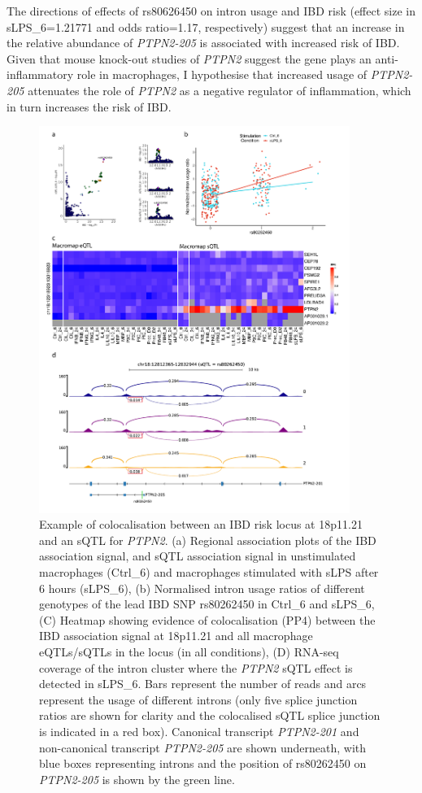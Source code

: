 The directions of effects of rs80626450 on intron usage and IBD risk (effect size in sLPS\_6=1.21771  and odds ratio=1.17, respectively) suggest that an increase in the relative abundance of \textit{PTPN2-205} is associated with increased risk of IBD. Given that mouse knock-out studies of \textit{PTPN2} suggest the gene plays an anti-inflammatory role in macrophages, I hypothesise that increased usage of \textit{PTPN2-205} attenuates the role of \textit{PTPN2} as a negative regulator of inflammation, which in turn increases the risk of IBD. \\

\begin{figure}[H]
  \centering
  \includegraphics[width=0.9\textwidth]{ptpn2}
  \caption{Example of colocalisation between an IBD risk locus at 18p11.21 and an sQTL for \textit{PTPN2}.  (a) Regional association plots of the IBD association signal, and sQTL association signal in unstimulated macrophages (Ctrl\_6) and macrophages stimulated with sLPS after 6 hours (sLPS\_6), (b) Normalised intron usage ratios of different genotypes of the lead IBD SNP rs80262450 in Ctrl\_6 and sLPS\_6, (C) Heatmap showing evidence of colocalisation (PP4) between the IBD association signal at 18p11.21 and all macrophage eQTLs/sQTLs in the locus (in all conditions), (D) RNA-seq coverage of the intron cluster where the \textit{PTPN2} sQTL effect is detected in sLPS\_6. Bars represent the number of reads and arcs represent the usage of different introns (only five splice junction ratios are shown for clarity and the colocalised sQTL splice junction is indicated in a red box). Canonical transcript \textit{PTPN2-201} and non-canonical transcript \textit{PTPN2-205} are shown underneath, with blue boxes representing introns and the position of rs80262450 on \textit{PTPN2-205} is shown by the green line.}
  \label{fig:ptpn2}   
\end{figure}

